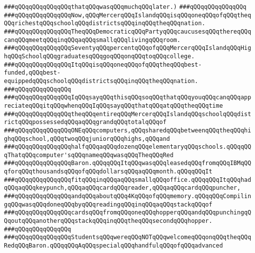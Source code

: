 \verb|###qQQqqQQqqQQqqQQqthatqQQqwasqQQqmuchqQQqlater.)|\newline
\verb|###qQQqqQQqqQQqqQQq|\newline
\verb|###qQQqqQQqqQQqqQQqNow,qQQqMercerqQQqIslandqQQqisqQQqoneqQQqofqQQqtheqQQqrichestqQQqschoolqQQqdistrictsqQQqinqQQqtheqQQqnation.|\newline
\verb|###qQQqqQQqqQQqqQQqTheqQQqDemocraticqQQqPartyqQQqcaucusesqQQqthereqQQqcanqQQqmeetqQQqinqQQqaqQQqsmallqQQqlivingqQQqroom.|\newline
\verb|###qQQqqQQqqQQqqQQqSeventyqQQqpercentqQQqofqQQqMercerqQQqIslandqQQqHighqQQqSchoolqQQqgraduatesqQQqgoqQQqonqQQqtoqQQqcollege.|\newline
\verb|###qQQqqQQqqQQqqQQqItqQQqisqQQqoneqQQqofqQQqtheqQQqbest-funded,qQQqbest-equippedqQQqschoolqQQqdistrictsqQQqinqQQqtheqQQqnation.|\newline
\verb|###qQQqqQQqqQQqqQQq|\newline
\verb|###qQQqqQQqqQQqqQQqIqQQqsayqQQqthisqQQqsoqQQqthatqQQqyouqQQqcanqQQqappreciateqQQqitqQQqwhenqQQqIqQQqsayqQQqthatqQQqatqQQqtheqQQqtime|\newline
\verb|###qQQqqQQqqQQqqQQqtheqQQqentireqQQqMercerqQQqIslandqQQqschoolqQQqdistrictqQQqpossessedqQQqaqQQqgrandqQQqtotalqQQqof|\newline
\verb|###qQQqqQQqqQQqqQQqONEqQQqcomputers,qQQqsharedqQQqbetweenqQQqtheqQQqhighqQQqschool,qQQqtwoqQQqjuniorqQQqhighs,qQQqand|\newline
\verb|###qQQqqQQqqQQqqQQqhalfqQQqaqQQqdozenqQQqelementaryqQQqschools.qQQqqQQqThatqQQqcomputer'sqQQqnameqQQqwasqQQqTheqQQqRed|\newline
\verb|###qQQqqQQqqQQqqQQqBaron.qQQqqQQqItqQQqwasqQQqleasedqQQqfromqQQqIBMqQQqforqQQqthousandsqQQqofqQQqdollarsqQQqaqQQqmonth.qQQqqQQqIt|\newline
\verb|###qQQqqQQqqQQqqQQqfitqQQqinqQQqaqQQqsmallqQQqoffice.qQQqqQQqItqQQqhadqQQqaqQQqkeypunch,qQQqaqQQqcardqQQqreader,qQQqaqQQqcardqQQqpuncher,|\newline
\verb|###qQQqqQQqqQQqqQQqandqQQqaboutqQQq4KqQQqofqQQqmemory.qQQqqQQqCompilingqQQqwasqQQqdoneqQQqbyqQQqreadingqQQqinqQQqaqQQqstackqQQqof|\newline
\verb|###qQQqqQQqqQQqqQQqcardsqQQqfromqQQqoneqQQqhopperqQQqandqQQqpunchingqQQqoutqQQqanotherqQQqstackqQQqinqQQqtheqQQqsecondqQQqhopper.|\newline
\verb|###qQQqqQQqqQQqqQQq|\newline
\verb|###qQQqqQQqqQQqqQQqStudentsqQQqwereqQQqNOTqQQqwelcomeqQQqonqQQqtheqQQqRedqQQqBaron.qQQqqQQqAqQQqspecialqQQqhandfulqQQqofqQQqadvanced|\newline
